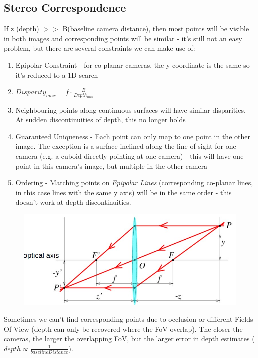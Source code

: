 \subsection{Stereo Correspondence}
If z (depth) $>>$ B(baseline camera distance), then most points will be visible in both images and corresponding points will be similar - it's still not an easy problem, but there are several constraints we can make use of:
\begin{enumerate}
    \item Epipolar Constraint - for co-planar cameras, the y-coordinate is the same so it's reduced to a 1D search 
    \item $Disparity_{max} = f \cdot \frac{B}{Depth_{min}}$
    \item Neighbouring points along continuous surfaces will have similar disparities. At sudden discontinuities of depth, this no longer holds
    \item Guaranteed Uniqueness - Each point can only map to one point in the other image. The exception is a surface inclined along the line of sight for one camera (e.g. a cuboid directly pointing at one camera) - this will have one point in this camera's image, but multiple in the other camera
    \item Ordering - Matching points on \emph{Epipolar Lines} (corresponding co-planar lines, in this case lines with the same y axis) will be in the same order - this doesn't work at depth discontinuities. 
\end{enumerate}
\begin{figure}[H]
    \centering
    \includegraphics[width = \textwidth]{Images/Thin_Lens_Diagram} %
\end{figure}
Sometimes we can't find corresponding points due to occlusion or different Fields Of View (depth can only be recovered where the FoV overlap). The closer the cameras, the larger the overlapping FoV, but the larger error in depth estimates ($depth \propto \frac{1}{baselineDistance})$. 

